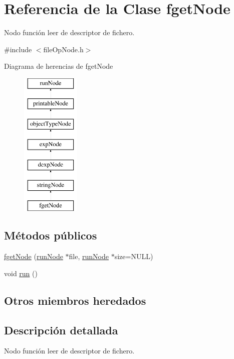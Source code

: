 \hypertarget{classfgetNode}{\section{Referencia de la Clase fget\-Node}
\label{classfgetNode}
}


Nodo función leer de descriptor de fichero.  




{\ttfamily \#include $<$file\-Op\-Node.\-h$>$}

Diagrama de herencias de fget\-Node\begin{figure}[H]
\begin{center}
\leavevmode
\includegraphics[height=7.000000cm]{classfgetNode}
\end{center}
\end{figure}
\subsection*{Métodos públicos}
\begin{DoxyCompactItemize}
\item 
\hyperlink{classfgetNode_a4d97f7eadb024edf1608a74598d5e472}{fget\-Node} (\hyperlink{classrunNode}{run\-Node} $\ast$file, \hyperlink{classrunNode}{run\-Node} $\ast$size=N\-U\-L\-L)
\item 
void \hyperlink{classfgetNode_a189fa91cf346d112382c333348d1ffcd}{run} ()
\end{DoxyCompactItemize}
\subsection*{Otros miembros heredados}


\subsection{Descripción detallada}
Nodo función leer de descriptor de fichero. 

